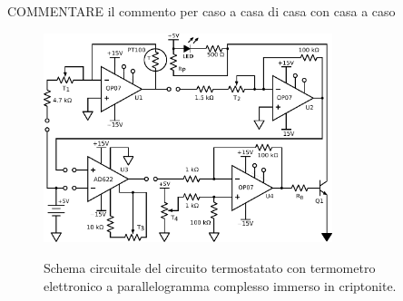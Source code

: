 COMMENTARE il commento per caso a casa di casa con casa a caso

\begin{figure}[ht]
 \centering
   {\includegraphics[width=0.75\textwidth]{../E06/latex/c2.pdf}}
 \caption{Schema circuitale del circuito termostatato con termometro elettronico a parallelogramma complesso immerso in criptonite.}
 \label{gr5:a_caso}
\end{figure}
